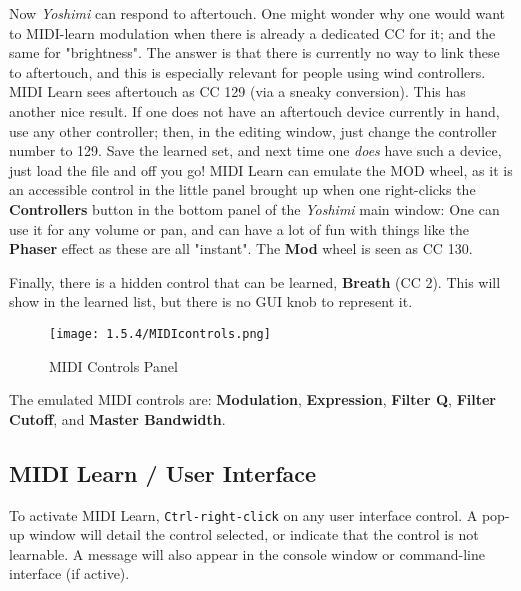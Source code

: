    Now \textsl{Yoshimi} can respond to aftertouch.
   One might wonder why one would want to MIDI-learn modulation when there is
   already a dedicated CC for it; and the same for "brightness". The answer is
   that there is currently no way to link these to aftertouch, and this is
   especially relevant for people using wind controllers.
   MIDI Learn sees aftertouch as CC 129 (via a sneaky conversion).
   This has another nice result.
   If one does not have an aftertouch device currently
   in hand, use any other controller; then, in the editing window, just change
   the controller number to 129. Save the learned set, and next time one
   \textsl{does} have such a device, just load the file and off you go!  MIDI
   Learn can emulate the MOD wheel, as it is an accessible control in the
   little panel brought up when one right-clicks the \textbf{Controllers}
   button in the bottom panel of the \textsl{Yoshimi} main window: One can use
   it for any volume or pan, and can have a lot of fun with things like the
   \textbf{Phaser} effect as these are all "instant".  The \textbf{Mod} wheel
   is seen as CC 130.

   Finally, there is a hidden control that can be learned, \textbf{Breath} (CC 2).
   This will show in the learned list, but there is no GUI knob to represent it.

\begin{figure}[H]
   \centering
   \texttt{[image: 1.5.4/MIDIcontrols.png]}
   \caption{MIDI Controls Panel}
   \label{fig:midi_controls_panel}
\end{figure}

   The emulated  MIDI controls are:
    \textbf{Modulation},
    \textbf{Expression},
    \textbf{Filter Q},
    \textbf{Filter Cutoff}, and
    \textbf{Master Bandwidth}.

\subsection{MIDI Learn / User Interface}
\label{subsec:midi_learn_user_interface}

   To activate MIDI Learn, \texttt{Ctrl-right-click}
   on any user interface control.
   A pop-up window will detail the control selected, or indicate that the
   control is not learnable.
   A message will also appear in the console window or command-line interface
   (if active).

